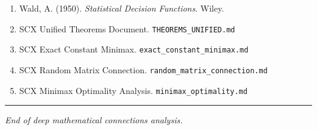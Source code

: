\documentclass[
  12pt,
]{ctexart}
\begin{document}
\begin{enumerate}
  Neyman, J., \& Pearson, E. S. (1933). On the problem of the most
  efficient tests of statistical hypotheses. \emph{Philosophical
  Transactions of the Royal Society A}, 231, 289-337.
\item
  Wald, A. (1950). \emph{Statistical Decision Functions}. Wiley.
\item
  SCX Unified Theorems Document. \texttt{THEOREMS\_UNIFIED.md}
\item
  SCX Exact Constant Minimax. \texttt{exact\_constant\_minimax.md}
\item
  SCX Random Matrix Connection. \texttt{random\_matrix\_connection.md}
\item
  SCX Minimax Optimality Analysis. \texttt{minimax\_optimality.md}
\end{enumerate}

\begin{center}\rule{0.5\linewidth}{0.5pt}\end{center}

\emph{End of deep mathematical connections analysis.}
\end{document}
